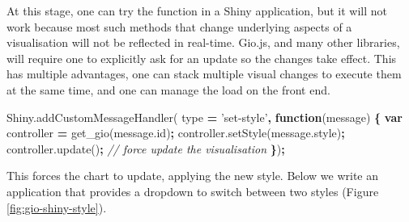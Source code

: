 \documentclass[10pt,]{krantz}
\makeatletter
\newenvironment{Shaded}{\begin{snugshade}}{\end{snugshade}}
\newcommand{\AttributeTok}[1]{\textcolor[rgb]{0.61,0.61,0.61}{#1}}
\newcommand{\CommentTok}[1]{\textcolor[rgb]{0.37,0.37,0.37}{\textit{#1}}}
\newcommand{\KeywordTok}[1]{\textcolor[rgb]{0.27,0.27,0.27}{\textbf{#1}}}
\newcommand{\NormalTok}[1]{#1}
\newcommand{\OperatorTok}[1]{\textcolor[rgb]{0.43,0.43,0.43}{\textbf{#1}}}
\newcommand{\StringTok}[1]{\textcolor[rgb]{0.5,0.5,0.5}{#1}}
\newcommand{\VariableTok}[1]{\textcolor[rgb]{0,0,0}{#1}}
\newenvironment{kframe}{%
\medskip{}
\setlength{\fboxsep}{.8em}
 \def\at@end@of@kframe{}%
 \ifinner\ifhmode%
  \def\at@end@of@kframe{\end{minipage}}%
  \begin{minipage}{\columnwidth}%
 \fi\fi%
 \def\FrameCommand##1{\hskip\@totalleftmargin \hskip-\fboxsep
 \colorbox{shadecolor}{##1}\hskip-\fboxsep
     \hskip-\linewidth \hskip-\@totalleftmargin \hskip\columnwidth}%
 \MakeFramed {\advance\hsize-\width
   \@totalleftmargin\z@ \linewidth\hsize
   \@setminipage}}%
 {\par\unskip\endMakeFramed%
 \at@end@of@kframe}
\renewenvironment{Shaded}{\begin{kframe}}{\end{kframe}}
\makeatother
\begin{document}
At this stage, one can try the function in a Shiny application, but it will not work because most such methods that change underlying aspects of a visualisation will not be reflected in real-time. Gio.js, and many other libraries, will require one to explicitly ask for an update so the changes take effect. This has multiple advantages, one can stack multiple visual changes to execute them at the same time, and one can manage the load on the front end.

\begin{Shaded}
\begin{Highlighting}[]
\VariableTok{Shiny}\NormalTok{.}\AttributeTok{addCustomMessageHandler}\NormalTok{(}
\NormalTok{  type }\OperatorTok{=} \StringTok{'set-style'}\OperatorTok{,} \KeywordTok{function}\NormalTok{(message) }\OperatorTok{\{}
    \KeywordTok{var}\NormalTok{ controller }\OperatorTok{=} \AttributeTok{get_gio}\NormalTok{(}\VariableTok{message}\NormalTok{.}\AttributeTok{id}\NormalTok{)}\OperatorTok{;}
    \VariableTok{controller}\NormalTok{.}\AttributeTok{setStyle}\NormalTok{(}\VariableTok{message}\NormalTok{.}\AttributeTok{style}\NormalTok{)}\OperatorTok{;}
    \VariableTok{controller}\NormalTok{.}\AttributeTok{update}\NormalTok{()}\OperatorTok{;} \CommentTok{// force update the visualisation}
\OperatorTok{\}}\NormalTok{)}\OperatorTok{;}
\end{Highlighting}
\end{Shaded}

This forces the chart to update, applying the new style. Below we write an application that provides a dropdown to switch between two styles (Figure \ref{fig:gio-shiny-style}).
\end{document}
